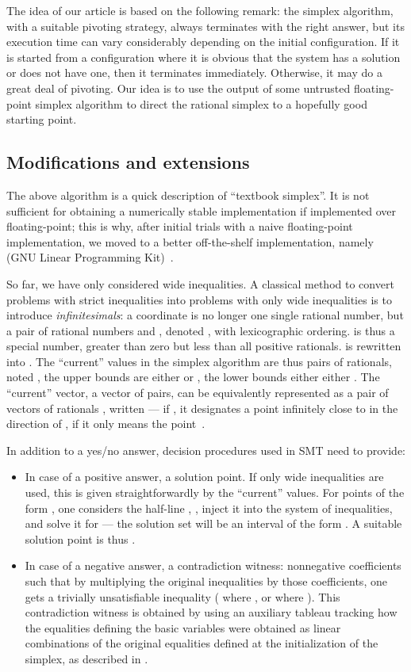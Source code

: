 The idea of our article is based on the following remark: the simplex algorithm, with a suitable pivoting strategy, always terminates with the right answer, but its execution time can vary considerably depending on the initial configuration. If it is started from a configuration where it is obvious that the system has a solution or does not have one, then it terminates immediately. Otherwise, it may do a great deal of pivoting. Our idea is to use the output of some untrusted floating-point simplex algorithm to direct the rational simplex to a hopefully good starting point.

\subsection{Modifications and extensions}
\label{part:extensions}
The above algorithm is a quick description of ``textbook simplex''. It is not sufficient for obtaining a numerically stable implementation if implemented over floating-point; this is why, after initial trials with a naive floating-point implementation, we moved to a better off-the-shelf implementation, namely  (GNU Linear Programming Kit)~\cite{GLPK}.

So far, we have only considered wide inequalities.
A classical method to convert problems with strict inequalities into problems with only wide inequalities is to introduce \emph{infinitesimals}: a coordinate is no longer one single rational number, but a pair of rational numbers  and , denoted , with lexicographic ordering.  is thus a special number, greater than zero but less than all positive rationals.  is rewritten into . The ``current'' values in the simplex algorithm are thus pairs  of rationals, noted , the upper bounds are either  or , the lower bounds either  either . The ``current'' vector, a vector of pairs, can be equivalently represented as a pair of vectors of rationals , written  --- if , it designates a point infinitely close to  in the direction of , if  it only means the point~.

In addition to a yes/no answer, decision procedures used in SMT need to provide:
\begin{itemize}
\item In case of a positive answer, a solution point. If only wide inequalities are used, this is given straightforwardly by the ``current'' values. For points of the form , one considers the half-line , , inject it into the system of inequalities, and solve it for  --- the solution set will be an interval of the form . A suitable solution point is thus .

\item In case of a negative answer, a contradiction witness: nonnegative coefficients such that by multiplying the original inequalities by those coefficients, one gets a trivially unsatisfiable inequality ( where , or  where ). This contradiction witness is obtained by using an auxiliary tableau tracking how the equalities  defining the basic variables were obtained as linear combinations of the original equalities defined at the initialization of the simplex, as described in \cite[Sec.~3.2.2]{SRI-CSL-06-01}.
\end{itemize}

